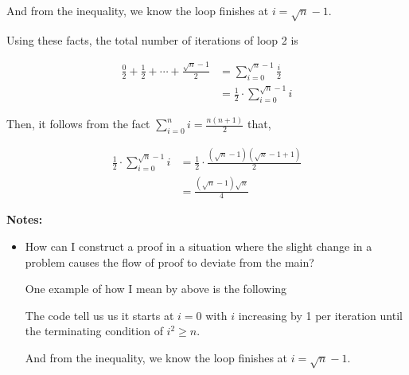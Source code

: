 \documentclass[12pt]{article}
\begin{document}
\begin{enumerate}[a.]
\begin{mdframed}
        \bigskip

        And from the inequality, we know the loop finishes at $i = \sqrt{n} - 1$.
        \color{black}

        \bigskip

        Using \color{red}these facts\color{black}, the total number of iterations of loop 2 is

        \color{red}
        \begin{align}
            \frac{0}{2} + \frac{1}{2} + \cdots + \frac{\sqrt{n} - 1}{2} &= \sum\limits_{i=0}^{\sqrt{n} - 1} \frac{i}{2}\\
            &= \frac{1}{2} \cdot \sum\limits_{i=0}^{\sqrt{n} - 1} i
        \end{align}

        \bigskip

        Then, it follows from the fact $\sum\limits_{i=0}^n i = \frac{n(n+1)}{2}$ that,

        \begin{align}
            \frac{1}{2} \cdot \sum\limits_{i=0}^{\sqrt{n}-1} i &= \frac{1}{2} \cdot \frac{(\sqrt{n}-1)(\sqrt{n}-1+1)}{2}\\
            &= \frac{(\sqrt{n}-1)\sqrt{n}}{4}
        \end{align}
        \color{black}

    \end{mdframed}

    \bigskip

    \textbf{Notes:}

    \begin{itemize}
        \item How can I construct a proof in a situation where the slight change in a problem
        causes the flow of proof to deviate from the main?

        \bigskip

        One example of how I mean by above is the following

        \begin{mdframed}
            The code tell us us it starts at $i = 0$ with \color{red}$i$ increasing by 1 per iteration
            until the terminating condition of $i^2 \geq n$.

            \bigskip

            And from the inequality, we know the loop finishes at $i = \sqrt{n} - 1$.
            \color{black}
        \end{mdframed}


\end{itemize}
\end{enumerate}
\end{document}
